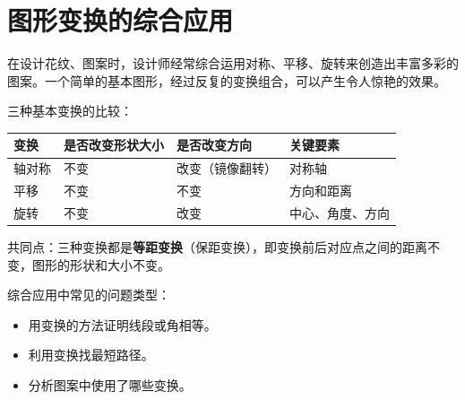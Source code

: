 \section*{图形变换的综合应用}


\begin{explore}


在设计花纹、图案时，设计师经常综合运用对称、平移、旋转来创造出丰富多彩的图案。一个简单的基本图形，经过反复的变换组合，可以产生令人惊艳的效果。

\end{explore}

\begin{understand}


三种基本变换的比较：

\begin{center}
\begin{tabular}{llll}
\toprule
变换 & 是否改变形状大小 & 是否改变方向 & 关键要素 \\
\midrule
轴对称 & 不变 & 改变（镜像翻转） & 对称轴 \\
平移 & 不变 & 不变 & 方向和距离 \\
旋转 & 不变 & 改变 & 中心、角度、方向 \\
\bottomrule
\end{tabular}
\end{center}


共同点：三种变换都是\textbf{等距变换}（保距变换），即变换前后对应点之间的距离不变，图形的形状和大小不变。

综合应用中常见的问题类型：
\begin{itemize}
  \item 用变换的方法证明线段或角相等。
  \item 利用变换找最短路径。
  \item 分析图案中使用了哪些变换。
\end{itemize}


\end{understand}

